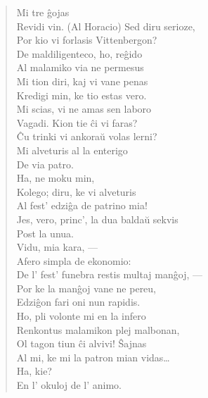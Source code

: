 \begin{verse}
 Mi tre \^gojas\\
                Revidi vin. {\footnotesize (Al Horacio)} Sed diru serioze,\\
                Por kio vi forlasis Vittenbergon?\\
 De maldiligenteco, ho, re\^gido\\
 Al malamiko via ne permesus\\
                Mi tion diri, kaj vi vane penas\\
                Kredigi min, ke tio estas vero.\\
                Mi scias, vi ne amas sen laboro\\
                Vagadi. Kion tie \^ci vi faras?\\
                \^Cu trinki vi ankora\u u volas lerni?\\
 Mi alveturis al la enterigo\\
                De via patro.\\
 Ha, ne moku min,\\
                Kolego; diru, ke vi alveturis\\
                Al fest' edzi\^ga de patrino mia!\\
 Jes, vero, princ', la dua balda\u u sekvis\\
                Post la unua.\\
 Vidu, mia kara, ---\\
                Afero simpla de ekonomio:\\
                De l' fest' funebra restis multaj man\^goj, ---\\
                Por ke la man\^goj vane ne pereu,\\
                Edzi\^gon fari oni nun rapidis.\\
                Ho, pli volonte mi en la infero\\
                Renkontus malamikon plej malbonan,\\
                Ol tagon tiun \^ci alvivi! \^Sajnas\\
                Al mi, ke mi la patron mian vidas\dots\\
 Ha, kie?\\
 En l' okuloj de l' animo.\\

\end{verse}
